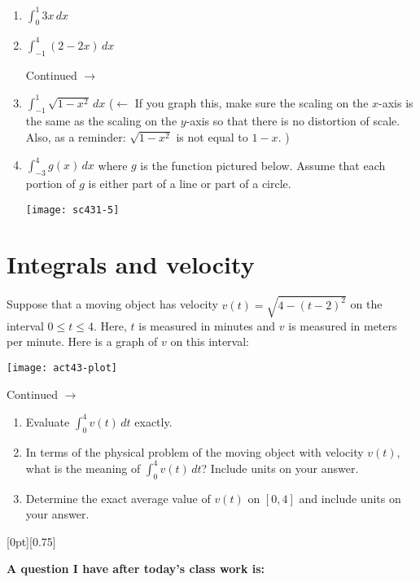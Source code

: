 \documentclass[11pt]{article}
\newcommand{\cuthere}{%
\noindent
\raisebox{-2.8pt}[0pt][0.75\baselineskip]{\small\ding{34}}
\unskip{\tiny\dotfill}
}
\def\ra{\rightarrow}
\def\pageturn{\vfill 
\begin{flushright}
	\begin{small}
		Continued $\ra$
	\end{small}
\end{flushright} \newpage}
\begin{document}
\begin{enumerate}
	\item $\displaystyle{\int_0^1 3x \, dx}$ 
	\vspace{1in} 
	
	\item $\displaystyle{\int_{-1}^4 (2-2x) \, dx}$
	\pageturn
	
	\item $\displaystyle{\int_{-1}^1 \sqrt{1-x^2} \, dx}$ ($\leftarrow$ If you graph this, make sure the scaling on the $x$-axis is the same as the scaling on the $y$-axis so that there is no distortion of scale. Also, as a reminder: $\sqrt{1-x^2}$ is not equal to $1-x$. ) 
	\vspace{1in}

	\item $\displaystyle{\int_{-3}^4 g(x) \, dx}$ where $g$ is the function pictured below. Assume that each portion of $g$ is either part of a line or part of a circle. 
	\begin{center}
		\texttt{[image: sc431-5]}
	\end{center}
	
	\vspace{1in}
	
\end{enumerate}




\section{Integrals and velocity} %
\label{sec:integrals_and_velocity}

Suppose that a moving object has velocity $v(t) = \sqrt{4 - (t-2)^2}$ on the interval $0 \leq t \leq 4$. Here, $t$ is measured in minutes and $v$ is measured in meters per minute. Here is a graph of $v$ on this interval: 
\begin{center}
	\texttt{[image: act43-plot]}
\end{center}

\pageturn

\begin{enumerate}
	\item Evaluate $\int_0^4 v(t) \, dt$ exactly. 
	\vspace{1in}
	
	\item In terms of the physical problem of the moving object with velocity $v(t)$, what is the meaning of $\int_0^4 v(t) \, dt$? Include units on your answer. 
	\vspace{1in}

	\item Determine the exact average value of $v(t)$ on $[0,4]$ and include units on your answer. 
	\vspace{1in}
	
	
	
\end{enumerate}




 \vfill 
 
 \cuthere
 
 \noindent
 \textbf{A question I have after today's class work is:}
 
 \vspace{1in}
\end{document}
